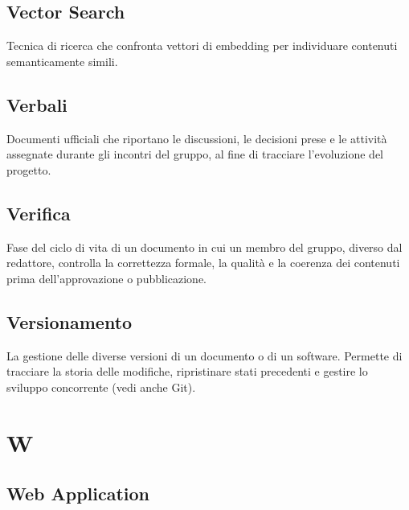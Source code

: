 \documentclass[a4paper, 11pt, oneside]{scrartcl} %
\begin{document}
\subsection*{Vector Search}
Tecnica di ricerca che confronta vettori di embedding per individuare contenuti semanticamente simili.
\vspace{0.5cm}

\subsection*{Verbali}


Documenti ufficiali che riportano le discussioni, le decisioni prese e le attività assegnate durante gli incontri del gruppo, al fine di tracciare l'evoluzione del progetto.

\vspace{0.5cm}

\subsection*{Verifica}


Fase del ciclo di vita di un documento in cui un membro del gruppo, diverso dal redattore, controlla la correttezza formale, la qualità e la coerenza dei contenuti prima dell'approvazione o pubblicazione.

\vspace{0.5cm}

\subsection*{Versionamento}
La gestione delle diverse versioni di un documento o di un software. Permette di tracciare la storia delle modifiche, ripristinare stati precedenti e gestire lo sviluppo concorrente (vedi anche Git).
\vspace{0.5cm}



\section*{W}


\subsection*{Web Application}
\end{document}
